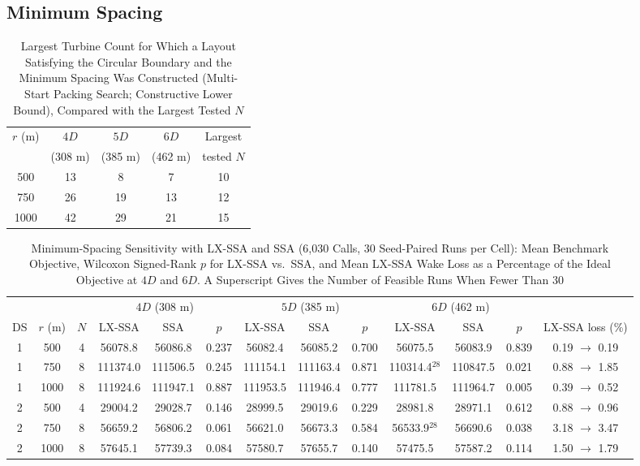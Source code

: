 \documentclass[journal,twoside]{IEEEtran}
\begin{document}
\subsection{Minimum Spacing}
\label{sec:spacing}
\begin{table}[!t]
\centering
\caption{Largest Turbine Count for Which a Layout Satisfying the Circular Boundary and the Minimum Spacing Was Constructed (Multi-Start Packing Search; Constructive Lower Bound), Compared with the Largest Tested $N$}
\label{tab:capacity}
\footnotesize
\begin{tabular}{ccccc}
\toprule
$r$ (m) & $4D$ & $5D$ & $6D$ & Largest \\
 & (308 m) & (385 m) & (462 m) & tested $N$ \\
\midrule
500 & 13 & 8 & 7 & 10 \\
750 & 26 & 19 & 13 & 12 \\
1000 & 42 & 29 & 21 & 15 \\
\bottomrule
\end{tabular}
\end{table}
\begin{table}[!t]
\centering
\caption{Minimum-Spacing Sensitivity with LX-SSA and SSA (6,030 Calls, 30 Seed-Paired Runs per Cell): Mean Benchmark Objective, Wilcoxon Signed-Rank $p$ for LX-SSA vs.\ SSA, and Mean LX-SSA Wake Loss as a Percentage of the Ideal Objective at $4D$ and $6D$. A Superscript Gives the Number of Feasible Runs When Fewer Than 30}
\label{tab:spacing-authors}
\footnotesize\setlength{\tabcolsep}{3pt}
\begin{tabular}{ccccccccccccc}
\toprule
& & & \multicolumn{3}{c}{$4D$ (308 m)} & \multicolumn{3}{c}{$5D$ (385 m)} & \multicolumn{3}{c}{$6D$ (462 m)} & \\
\cmidrule(lr){4-6}\cmidrule(lr){7-9}\cmidrule(lr){10-12}
DS & $r$ (m) & $N$ & LX-SSA & SSA & $p$ & LX-SSA & SSA & $p$ & LX-SSA & SSA & $p$ & LX-SSA loss (\%) \\
\midrule
1 & 500 & 4 & 56078.8 & 56086.8 & 0.237 & 56082.4 & 56085.2 & 0.700 & 56075.5 & 56083.9 & 0.839 & 0.19 $\rightarrow$ 0.19 \\
1 & 750 & 8 & 111374.0 & 111506.5 & 0.245 & 111154.1 & 111163.4 & 0.871 & 110314.4$^{28}$ & 110847.5 & 0.021 & 0.88 $\rightarrow$ 1.85 \\
1 & 1000 & 8 & 111924.6 & 111947.1 & 0.887 & 111953.5 & 111946.4 & 0.777 & 111781.5 & 111964.7 & 0.005 & 0.39 $\rightarrow$ 0.52 \\
2 & 500 & 4 & 29004.2 & 29028.7 & 0.146 & 28999.5 & 29019.6 & 0.229 & 28981.8 & 28971.1 & 0.612 & 0.88 $\rightarrow$ 0.96 \\
2 & 750 & 8 & 56659.2 & 56806.2 & 0.061 & 56621.0 & 56673.3 & 0.584 & 56533.9$^{28}$ & 56690.6 & 0.038 & 3.18 $\rightarrow$ 3.47 \\
2 & 1000 & 8 & 57645.1 & 57739.3 & 0.084 & 57580.7 & 57655.7 & 0.140 & 57475.5 & 57587.2 & 0.114 & 1.50 $\rightarrow$ 1.79 \\
\bottomrule
\end{tabular}
\end{table}
\end{document}

